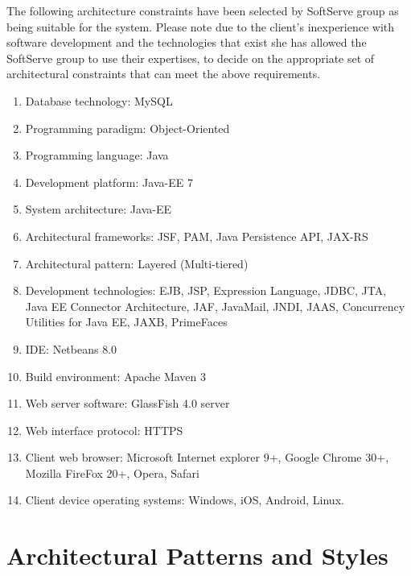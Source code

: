 \documentclass[12pt]{article}
\begin{document}
The following architecture constraints have been selected by SoftServe group as being suitable for the system. Please note due to the client's inexperience with software development and the technologies that exist she has allowed the SoftServe group to use their expertises, to decide on the appropriate set of architectural constraints that can meet the above requirements.
\begin{enumerate}
\item Database technology: MySQL
\item Programming paradigm: Object-Oriented
\item Programming language: Java
\item Development platform: Java-EE 7 
\item System architecture: Java-EE
\item Architectural frameworks: JSF, PAM, Java Persistence API, JAX-RS
\item Architectural pattern: Layered (Multi-tiered)
\item Development technologies: EJB, JSP, Expression Language, JDBC, JTA, Java EE Connector Architecture, JAF, JavaMail, JNDI, JAAS, Concurrency Utilities for Java EE, JAXB, PrimeFaces
\item IDE: Netbeans 8.0
\item Build environment: Apache Maven 3
\item Web server software: GlassFish 4.0 server
\item Web interface protocol: HTTPS
\item Client web browser: Microsoft Internet explorer 9+, Google Chrome 30+, Mozilla FireFox 20+, Opera, Safari
\item Client device operating systems: Windows, iOS, Android, Linux. 
\end{enumerate}
\vspace{0.5in}


\section{Architectural Patterns and Styles} %

\end{document}
